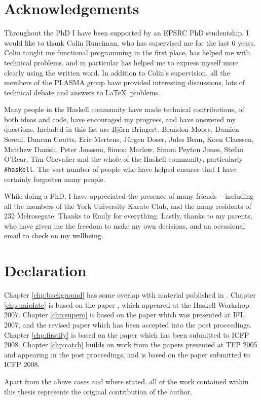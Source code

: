 \chapter*{Acknowledgements}

Throughout the PhD I have been supported by an EPSRC PhD studentship. I would like to thank Colin Runciman, who has supervised me for the last 6 years. Colin taught me functional programming in the first place, has helped me with technical problems, and in particular has helped me to express myself more clearly using the written word. In addition to Colin's supervision, all the members of the PLASMA group have provided interesting discussions, lots of technical debate and answers to \LaTeX\ problems.

Many people in the Haskell community have made technical contributions, of both ideas and code, have encouraged my progress, and have answered my questions. Included in this list are Bj\"{o}rn Bringert, Brandon Moore, Damien Sereni, Duncan Coutts, Eric Mertens, J\"{u}rgen Doser, Jules Bean, Koen Claessen, Matthew Danish, Peter Jonsson, Simon Marlow, Simon Peyton Jones, Stefan O'Rear, Tim Chevalier and the whole of the Haskell community, particularly \verb"#haskell". The vast number of people who have helped ensures that I have certainly forgotten many people.

While doing a PhD, I have appreciated the presence of many friends -- including all the members of the York University Karate Club, and the many residents of 232 Melrosegate. Thanks to Emily for everything. Lastly, thanks to my parents, who have given me the freedom to make my own decisions, and an occasional email to check on my wellbeing.

\chapter*{Declaration}

Chapter \ref{chp:background} has some overlap with material published in \cite{me:yhc_core}. Chapter \ref{chp:uniplate} is based on the paper \cite{me:uniplate}, which appeared at the Haskell Workshop 2007. Chapter \ref{chp:supero} is based on the paper \cite{me:supero_ifl} which was presented at IFL 2007, and the revised paper \cite{me:supero} which has been accepted into the post proceedings. Chapter \ref{chp:firstify} is based on the paper \cite{me:firstify_icfp} which has been submitted to ICFP 2008. Chapter \ref{chp:catch} builds on work from the papers \cite{me:catch_tfp_original,me:catch_tfp} presented at TFP 2005 and appearing in the post proceedings, and is based on the paper \cite{me:catch_icfp} submitted to ICFP 2008.

Apart from the above cases and where stated, all of the work contained within this thesis represents the original contribution of the author.
